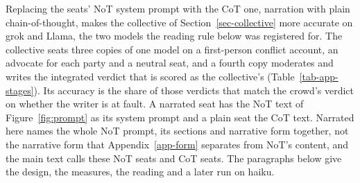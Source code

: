 Replacing the seats' NoT system prompt with the CoT one, narration with
plain chain-of-thought, makes the
collective of Section~\ref{sec-collective} more accurate on grok and Llama,
the two models the reading rule below was registered for. The collective
seats three copies of one model on a first-person conflict account, an
advocate for each party and a neutral seat, and a fourth copy moderates and
writes the integrated verdict that is scored as the collective's
(Table~\ref{tab-app-stages}). Its accuracy is the share of those verdicts
that match the crowd's verdict on whether the writer is at fault. A narrated
seat has the NoT text of Figure~\ref{fig:prompt} as its system prompt and a
plain seat the CoT text. Narrated here names the whole NoT prompt, its
sections and narrative form together, not the narrative form that
Appendix~\ref{app-form} separates from NoT's content, and the main text calls
these NoT seats and CoT seats.
The paragraphs below give the design, the measures,
the reading and a later run on haiku.

